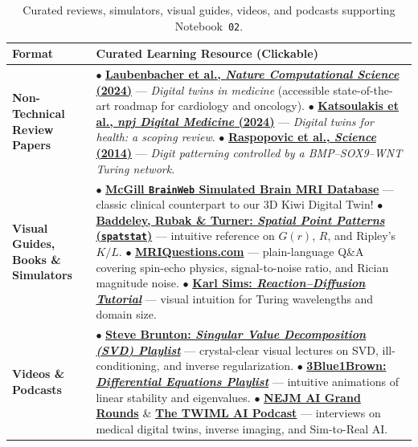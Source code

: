 \documentclass[10.5pt,a4paper]{article}
\begin{document}
\begin{table}[H]
\centering
\scriptsize
\renewcommand{\arraystretch}{1.20}
\begin{tabularx}{\textwidth}{L{2.55cm} Y}
\toprule
{}
\textbf{Format} & \textbf{Curated Learning Resource (Clickable)} \\
\midrule
\textbf{Non-Technical Review Papers} &
$\bullet$ \href{https://doi.org/10.1038/s43588-024-00607-6}{\textbf{Laubenbacher et al., \emph{Nature Computational Science} (2024)}} --- \emph{Digital twins in medicine} (accessible state-of-the-art roadmap for cardiology and oncology). \newline
$\bullet$ \href{https://doi.org/10.1038/s41746-024-01073-0}{\textbf{Katsoulakis et al., \emph{npj Digital Medicine} (2024)}} --- \emph{Digital twins for health: a scoping review}. \newline
$\bullet$ \href{https://doi.org/10.1126/science.1252960}{\textbf{Raspopovic et al., \emph{Science} (2014)}} --- \emph{Digit patterning controlled by a BMP--SOX9--WNT Turing network}. \\
\textbf{Visual Guides, Books \& Simulators} &
$\bullet$ \href{https://brainweb.bic.mni.mcgill.ca/brainweb/}{\textbf{McGill \texttt{BrainWeb} Simulated Brain MRI Database}} --- classic clinical counterpart to our 3D Kiwi Digital Twin! \newline
$\bullet$ \href{https://book.spatstat.org/}{\textbf{Baddeley, Rubak \& Turner: \emph{Spatial Point Patterns} (\texttt{spatstat})}} --- intuitive reference on $G(r)$, $R$, and Ripley's $K/L$. \newline
$\bullet$ \href{https://mriquestions.com/}{\textbf{MRIQuestions.com}} --- plain-language Q\&A covering spin-echo physics, signal-to-noise ratio, and Rician magnitude noise. \newline
$\bullet$ \href{https://www.karlsims.com/rd.html}{\textbf{Karl Sims: \emph{Reaction--Diffusion Tutorial}}} --- visual intuition for Turing wavelengths and domain size. \\
\textbf{Videos \& Podcasts} &
$\bullet$ \href{https://www.youtube.com/playlist?list=PLMrJAkhIeNNQ0xhyjHz_gRm7OTiCnvCDP}{\textbf{Steve Brunton: \emph{Singular Value Decomposition (SVD) Playlist}}} --- crystal-clear visual lectures on SVD, ill-conditioning, and inverse regularization. \newline
$\bullet$ \href{https://www.youtube.com/playlist?list=PLZHQObOWTQDNPOjrT6KVlfJuKtYTtzqH6}{\textbf{3Blue1Brown: \emph{Differential Equations Playlist}}} --- intuitive animations of linear stability and eigenvalues. \newline
$\bullet$ \href{https://ai-podcast.nejm.org/}{\textbf{NEJM AI Grand Rounds}} \& \href{https://twimlai.com/}{\textbf{The TWIML AI Podcast}} --- interviews on medical digital twins, inverse imaging, and Sim-to-Real AI. \\
\bottomrule
\end{tabularx}
\caption{Curated reviews, simulators, visual guides, videos, and podcasts supporting Notebook~\texttt{02}.}
\label{tab:lab5-p2-resources}
\end{table}
\end{document}
